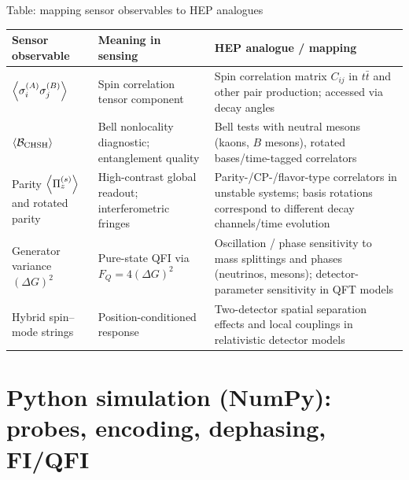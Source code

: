 \documentclass[aspectratio=169]{beamer}
\newcommand{\sA}[1]{\sigma_{#1}^{(A)}}
\newcommand{\sB}[1]{\sigma_{#1}^{(B)}}
\newcommand{\PiZs}{\Pi_{z}^{(s)}}
\begin{document}
\begin{frame}{Table: mapping sensor observables to HEP analogues}
\scriptsize
\renewcommand{\arraystretch}{1.15}
\begin{center}
\begin{tabular}{>{\raggedright\arraybackslash}p{3.3cm}
                >{\raggedright\arraybackslash}p{4.4cm}
                >{\raggedright\arraybackslash}p{4.9cm}}
\toprule
\textbf{Sensor observable} & \textbf{Meaning in sensing} & \textbf{HEP analogue / mapping} \\
\midrule
$\expval{\sA{i}\sB{j}}$ & Spin correlation tensor component & Spin correlation matrix $C_{ij}$ in $t\bar t$ and other pair production; accessed via decay angles \citep{BernreutherHeislerSi2015JHEP} \\
$\expval{\mathcal{B}_{\mathrm{CHSH}}}$ & Bell nonlocality diagnostic; entanglement quality & Bell tests with neutral mesons (kaons, $B$ mesons), rotated bases/time-tagged correlators \citep{BertlmannHiesmayr2001PRA} \\
Parity $\expval{\PiZs}$ and rotated parity & High-contrast global readout; interferometric fringes & Parity-/CP-/flavor-type correlators in unstable systems; basis rotations correspond to different decay channels/time evolution \citep{BertlmannHiesmayr2001PRA} \\
Generator variance $(\Delta G)^2$ & Pure-state QFI via $F_Q=4(\Delta G)^2$ & Oscillation / phase sensitivity to mass splittings and phases (neutrinos, mesons); detector-parameter sensitivity in QFT models \citep{Banerjee2015EPJC,PozasKerstjensMartinMartinez2015PRD} \\
Hybrid spin--mode strings & Position-conditioned response & Two-detector spatial separation effects and local couplings in relativistic detector models \citep{PeresTerno2004RMP,PozasKerstjensMartinMartinez2015PRD} \\
\bottomrule
\end{tabular}
\end{center}
\end{frame}

\section{Python simulation (NumPy): probes, encoding, dephasing, FI/QFI}
\end{document}
